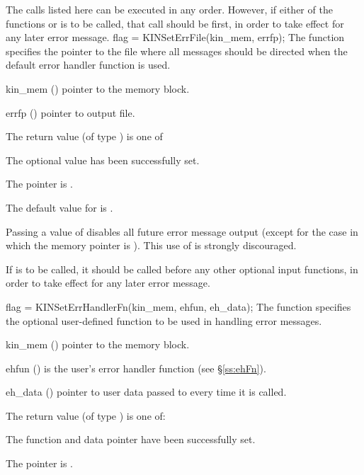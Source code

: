 The calls listed here can be executed in any order. However, if either of the
functions  or  is to be called, that
call should be first, in order to take effect for any later error message.
{
flag = KINSetErrFile(kin\_mem, errfp);
}
{
  The function  specifies the pointer to the file
  where all {\kinsol} messages should be directed when the default
  {\kinsol} error handler function is used.
}
{
  \begin{args}
  \item[kin\_mem] ()
    pointer to the {\kinsol} memory block.
  \item[errfp] ()
    pointer to output file.
  \end{args}
}
{
  The return value  (of type ) is one of
  \begin{args}
  \item[\Id{KIN\_SUCCESS}]
    The optional value has been successfully set.
  \item[\Id{KIN\_MEM\_NULL}]
    The  pointer is .
  \end{args}
}
{
  The default value for  is .

  Passing a value of  disables all future error message output
  (except for the case in which the {\kinsol} memory pointer is ).
  This use of  is strongly discouraged.

  {\warn}If  is to be called, it should be called before any
  other optional input functions, in order to take effect for any later error message.
}
{
flag = KINSetErrHandlerFn(kin\_mem, ehfun, eh\_data);
}
{
  The function  specifies the optional user-defined function
  to be used in handling error messages.
}
{
  \begin{args}
  \item[kin\_mem] ()
    pointer to the {\kinsol} memory block.
  \item[ehfun] ()
    is the user's {\CC} error handler function (see \S\ref{ss:ehFn}).
  \item[eh\_data] ()
    pointer to user data passed to  every time it is called.
  \end{args}
}
{
  The return value  (of type ) is one of:
  \begin{args}
  \item[\Id{KIN\_SUCCESS}]
    The function  and data pointer  have been successfully set.
  \item[\Id{KIN\_MEM\_NULL}]
    The  pointer is .
  \end{args}
}
